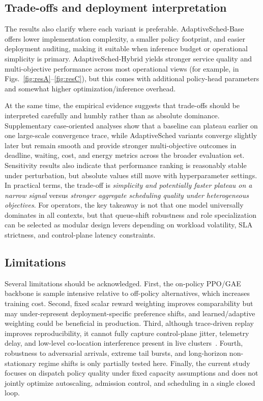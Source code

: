 \documentclass[journal]{IEEEtran}
\begin{document}
\subsection{Trade-offs and deployment interpretation}
The results also clarify where each variant is preferable. AdaptiveSched-Base offers lower implementation complexity, a smaller policy footprint, and easier deployment auditing, making it suitable when inference budget or operational simplicity is primary. AdaptiveSched-Hybrid yields stronger service quality and multi-objective performance across most operational views (for example, in Figs.~\ref{fig:resA}--\ref{fig:resC}), but this comes with additional policy-head parameters and somewhat higher optimization/inference overhead. 

At the same time, the empirical evidence suggests that trade-offs should be interpreted carefully and humbly rather than as absolute dominance. Supplementary case-oriented analyses show that a baseline can plateau earlier on one large-scale convergence trace, while AdaptiveSched variants converge slightly later but remain smooth and provide stronger multi-objective outcomes in deadline, waiting, cost, and energy metrics across the broader evaluation set. Sensitivity results also indicate that performance ranking is reasonably stable under perturbation, but absolute values still move with hyperparameter settings. In practical terms, the trade-off is \emph{simplicity and potentially faster plateau on a narrow signal} versus \emph{stronger aggregate scheduling quality under heterogeneous objectives}. For operators, the key takeaway is not that one model universally dominates in all contexts, but that queue-shift robustness and role specialization can be selected as modular design levers depending on workload volatility, SLA strictness, and control-plane latency constraints.

\subsection{Limitations}
Several limitations should be acknowledged. First, the on-policy PPO/GAE backbone is sample intensive relative to off-policy alternatives, which increases training cost. Second, fixed scalar reward weighting improves comparability but may under-represent deployment-specific preference shifts, and learned/adaptive weighting could be beneficial in production. Third, although trace-driven replay improves reproducibility, it cannot fully capture control-plane jitter, telemetry delay, and low-level co-location interference present in live clusters~\cite{zhou2024aireview}. Fourth, robustness to adversarial arrivals, extreme tail bursts, and long-horizon non-stationary regime shifts is only partially tested here. Finally, the current study focuses on dispatch policy quality under fixed capacity assumptions and does not jointly optimize autoscaling, admission control, and scheduling in a single closed loop.
\end{document}
